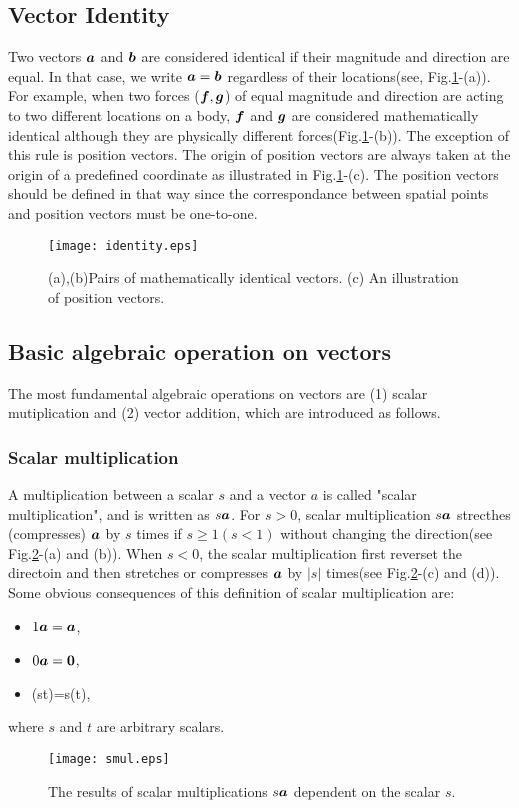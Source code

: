 \documentclass[10pt,a4j]{article}
\begin{document}
\subsection{Vector Identity}
Two vectors $\mbox{\boldmath $a$}$ and $\mbox{\boldmath $b$}$ are considered identical 
if their magnitude and direction are equal.
In that case, we write $\mbox{\boldmath $a$}=\mbox{\boldmath $b$}$ regardless of their locations(see, Fig.\ref{fig:fig1_2}-(a)). 
For example, when two forces ($\mbox{\boldmath $f$}, \mbox{\boldmath $g$}$) of equal magnitude and direction 
are acting to two different locations on a body, 
$\mbox{\boldmath $f$}$ and $\mbox{\boldmath $g$}$ are considered mathematically identical although they 
are physically different forces(Fig.\ref{fig:fig1_2}-(b)).
The exception of this rule is position vectors. 
The origin of position vectors are always taken at 
the origin of a predefined coordinate as illustrated in Fig.\ref{fig:fig1_2}-(c).
The position vectors should be defined in that way since the correspondance between 
spatial points and position vectors must be one-to-one. 
\begin{figure}[h]
	\begin{center}
	\texttt{[image: identity.eps]} 
	\end{center}
	\caption{(a),(b)Pairs of mathematically identical vectors. 
	(c) An illustration of position vectors.} 
	\label{fig:fig1_2}
\end{figure}
\subsection{Basic algebraic operation on vectors}
The most fundamental algebraic operations on vectors are (1) scalar mutiplication 
and (2) vector addition, which are introduced as follows.
\subsubsection{Scalar multiplication}
A multiplication between a scalar $s$ and a vector $a$ is called "scalar multiplication", 
and is written as $s\mbox{\boldmath $a$}$. For $s>0$, scalar multiplication $s\mbox{\boldmath $a$}$ strecthes (compresses) $\mbox{\boldmath $a$}$ 
by $s$ times if $s \geq 1 (s<1)$ without changing the direction(see Fig.\ref{fig:fig1_3}-(a) and (b)).
When $s<0$, the scalar multiplication first reverset the directoin and then stretches or compresses 
$\mbox{\boldmath $a$}$ by $|s|$ times(see Fig.\ref{fig:fig1_3}-(c) and (d)).
Some obvious consequences of this definition of scalar multiplication are:
\begin{itemize}
\item 
	$1\mbox{\boldmath $a$}=\mbox{\boldmath $a$}$,
\item 
	$0\mbox{\boldmath $a$}=\mbox{\boldmath $0$}$,
\item
	(st)=s(t),
\end{itemize}
where $s$ and $t$ are arbitrary scalars. 
\begin{figure}[h]
	\begin{center}
	\texttt{[image: smul.eps]} 
	\end{center}
	\caption{The results of scalar multiplications $s\mbox{\boldmath $a$}$ dependent on the scalar $s$.} 
	\label{fig:fig1_3}
\end{figure}
\end{document}
